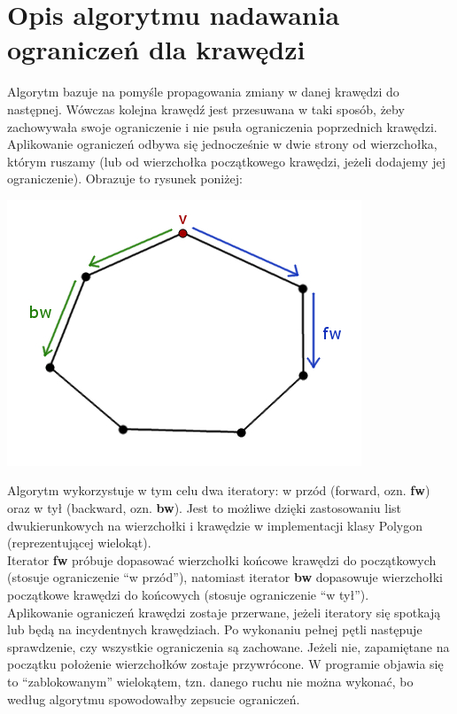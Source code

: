 \documentclass[12pt]{article}
\begin{document}
\section{Opis algorytmu nadawania ograniczeń dla krawędzi}
Algorytm bazuje na pomyśle propagowania zmiany w danej krawędzi do następnej. Wówczas kolejna krawędź jest przesuwana w taki sposób, żeby zachowywała swoje ograniczenie i nie psuła ograniczenia poprzednich krawędzi. Aplikowanie ograniczeń odbywa się jednocześnie w dwie strony od wierzchołka, którym ruszamy (lub od wierzchołka początkowego krawędzi, jeżeli dodajemy jej ograniczenie). Obrazuje to rysunek poniżej:
\begin{center}
\includegraphics[scale = 0.6]{diagram.jpg}
\end{center}
Algorytm wykorzystuje w tym celu dwa iteratory: w przód (forward, ozn. \textbf{fw}) oraz w tył (backward, ozn. \textbf{bw}). Jest to możliwe dzięki zastosowaniu list dwukierunkowych na wierzchołki i krawędzie w implementacji klasy Polygon (reprezentującej wielokąt).\\[\baselineskip]
Iterator \textbf{fw} próbuje dopasować wierzchołki końcowe krawędzi do początkowych (stosuje ograniczenie ``w przód''), natomiast iterator \textbf{bw} dopasowuje wierzchołki początkowe krawędzi do końcowych (stosuje ograniczenie ``w tył'').\\[\baselineskip]
Aplikowanie ograniczeń krawędzi zostaje przerwane, jeżeli iteratory się spotkają lub będą na incydentnych krawędziach. Po wykonaniu pełnej pętli następuje sprawdzenie, czy wszystkie ograniczenia są zachowane. Jeżeli nie, zapamiętane na początku położenie wierzchołków zostaje przywrócone. W programie objawia się to ``zablokowanym'' wielokątem, tzn. danego ruchu nie można wykonać, bo według algorytmu spowodowałby zepsucie ograniczeń.\\[\baselineskip]
\end{document}
